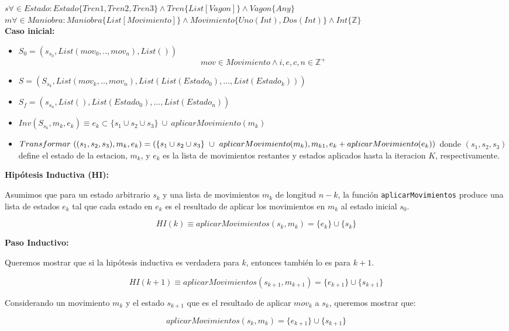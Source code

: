 \documentclass[12pt, a4paper]{article}
\begin{document}
  $s \forall \in Estado : Estado \{Tren1,Tren2,Tren3\} \wedge  Tren \{List[Vagon]\} \wedge Vagon\{Any\}$ \\
  $m \forall \in Maniobra : Maniobra \{List[Movimiento]\} \wedge Movimiento \{Uno(Int),Dos(Int)\} \wedge Int \{\mathbb{Z}\}$ \\
  \textbf{Caso inicial:} \\
  \begin{itemize}
    \item $S_0 = (s_{s_0}, List(mov_0,..,mov_n),List() )$
    \[ mov \in Movimiento \wedge i,e,c,n \in \mathbb{Z^+}\]
    \item $S = (S_{s_k} , List(mov_k,..,mov_n),List(List(Estado_0), ...,List(Estado_k)) )$
  \item $S_f = (s_{s_n}, List(),List(Estado_0), ...,List(Estado_n)) $
  \item $Inv(S_{s_k} , m_k, e_k) \equiv e_k \subset \{s_1 \cup s_2 \cup s_3\} ~	\cup ~ {aplicarMovimiento(m_k)} $
    \item $Transformar~ ((s_1,s_2,s_3), m_k, e_k ) = ( \{s_1 \cup s_2 \cup s_3\} ~	\cup ~ {aplicarMovimiento(m_k)}, \\ m_{k1}, e_{k} + aplicarMovimiento(e_{k}))$ donde $(s_1,s_2,s_3)$ define el estado de la estacion, $m_k$, y $e_k$ es la lista de movimientos restantes y estados aplicados hasta la iteracion $K$, respectivamente.
\end{itemize} 
\textbf{Hipótesis Inductiva (HI):}

Asumimos que para un estado arbitrario \(s_k\) y una lista de movimientos \(m_k\) de longitud \(n-k\), la función \texttt{aplicarMovimientos} produce una lista de estados \(e_k\) tal que cada estado en \(e_k\) es el resultado de aplicar los movimientos en \(m_k\) al estado inicial \(s_0\).

\[ HI(k) \equiv aplicarMovimientos(s_k, m_k) = \{e_k\} \cup \{s_{k}\}\]

\textbf{Paso Inductivo:}

Queremos mostrar que si la hipótesis inductiva es verdadera para \(k\), entonces también lo es para \(k+1\).

\[ HI(k+1) \equiv aplicarMovimientos(s_{k+1}, m_{k+1}) = \{e_{k+1}\} \cup \{s_{k+1}\}\]

Considerando un movimiento  \(m_{k}\) y el estado  \(s_{k+1}\) que es el resultado de aplicar \(mov_{k}\) a \(s_k\), queremos mostrar que:

\[ aplicarMovimientos(s_{k}, m_k ) = \{e_{k+1} \}\cup \{s_{k+1}\} \]
\end{document}
